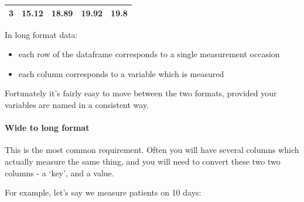 \documentclass[]{article}
\newenvironment{Shaded}{\begin{snugshade}}{\end{snugshade}}
\newcommand{\KeywordTok}[1]{\textcolor[rgb]{0.13,0.29,0.53}{\textbf{#1}}}
\newcommand{\DataTypeTok}[1]{\textcolor[rgb]{0.13,0.29,0.53}{#1}}
\newcommand{\DecValTok}[1]{\textcolor[rgb]{0.00,0.00,0.81}{#1}}
\newcommand{\StringTok}[1]{\textcolor[rgb]{0.31,0.60,0.02}{#1}}
\newcommand{\OperatorTok}[1]{\textcolor[rgb]{0.81,0.36,0.00}{\textbf{#1}}}
\newcommand{\NormalTok}[1]{#1}
\providecommand{\tightlist}{%
  \setlength{\itemsep}{0pt}\setlength{\parskip}{0pt}}
\let\oldparagraph\paragraph
\renewcommand{\paragraph}[1]{\oldparagraph{#1}\mbox{}}
\theoremstyle{definition}
\theoremstyle{definition}
\theoremstyle{definition}
\theoremstyle{remark}
\begin{document}
\begin{longtable}[]{@{}ccccc@{}}
\begin{minipage}[t]{0.11\columnwidth}
3\strut
\end{minipage} & \begin{minipage}[t]{0.11\columnwidth}\centering\strut
15.12\strut
\end{minipage} & \begin{minipage}[t]{0.11\columnwidth}\centering\strut
18.89\strut
\end{minipage} & \begin{minipage}[t]{0.11\columnwidth}\centering\strut
19.92\strut
\end{minipage} & \begin{minipage}[t]{0.11\columnwidth}\centering\strut
19.8\strut
\end{minipage}\tabularnewline
\bottomrule
\end{longtable}

In long format data:

\begin{itemize}
\tightlist
\item
  each row of the dataframe corresponds to a single measurement occasion
\item
  each column corresponds to a variable which is measured
\end{itemize}

Fortunately it's fairly easy to move between the two formats, provided
your variables are named in a consistent way.

\hypertarget{wide-to-long}{\paragraph{Wide to long
format}\label{wide-to-long}}

This is the most common requirement. Often you will have several columns
which actually measure the same thing, and you will need to convert
these two two columns - a `key', and a value.

For example, let's say we measure patients on 10 days:

\begin{Shaded}
\end{Shaded}
\end{document}
